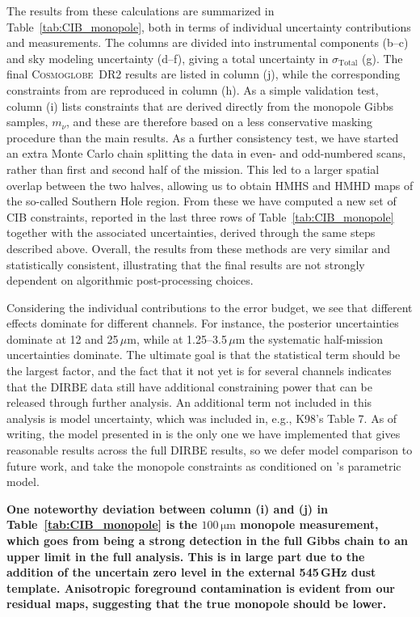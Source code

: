 \documentclass{aa}
\newcommand{\cosmoglobe}{\textsc{Cosmoglobe}}
\begin{document}
The results from these calculations are summarized in
Table~\ref{tab:CIB_monopole}, both in terms of individual uncertainty
contributions and measurements.
The columns are divided into instrumental components (b--c) and sky modeling uncertainty (d--f), giving a total uncertainty in $\sigma_\mathrm{Total}$ (g).
The final
\cosmoglobe\ DR2 results are listed in column (j), while the
corresponding constraints from \citet{hauser1998} are reproduced in
column (h). As a simple validation test, column (i) lists constraints
that are derived directly from the monopole Gibbs samples, $m_{\nu}$,
and these are therefore based on a less conservative masking procedure
than the main results. 
As a further consistency test, we have started an extra Monte Carlo chain splitting the data in even- and odd-numbered scans, rather than first and second half of the mission.
This led to a larger spatial overlap between the two halves, allowing us to obtain HMHS and HMHD maps of the so-called Southern Hole region. 
From these we have computed a new set of CIB constraints, reported in the last three rows of Table~\ref{tab:CIB_monopole} together with the associated uncertainties, derived through the same steps described above.
Overall, the results from these methods are
very similar and statistically consistent, illustrating that the final results are not
strongly dependent on algorithmic post-processing choices.

Considering the individual contributions to the error budget, we see
that different effects dominate for different channels. For instance,
the posterior uncertainties dominate at 12 and 25$\,\mu\mathrm{m}$,
while at 1.25--3.5$\,\mu\mathrm{m}$ the systematic half-mission
uncertainties dominate. The ultimate goal is that the statistical term
should be the largest factor, and the fact that it not yet is for
several channels indicates that the DIRBE data still have additional
constraining power that can be released through further analysis.
An additional term not included in this analysis is model uncertainty, which was
included in, e.g., K98's Table 7. As of writing, the model presented in
\citet{CG02_02} is the only one we have implemented that gives
reasonable results across the full DIRBE results, so we defer model comparison
to future work, and take the monopole constraints as conditioned on \citet{CG02_02}'s parametric model.

\textbf{One noteworthy deviation between column (i) and (j) in Table~\ref{tab:CIB_monopole} is the $100\,\mathrm{\mu m}$ monopole measurement, which goes from being a strong detection in the full Gibbs chain to an upper limit in the full analysis. This is in large part due to the addition of the uncertain zero level in the external 545\,GHz dust template. Anisotropic foreground contamination is evident from our residual maps, suggesting that the true monopole should be lower. }
\end{document}
